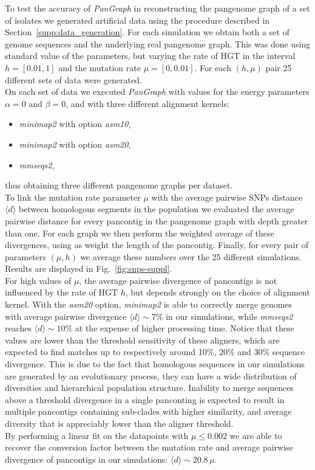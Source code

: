 \documentclass[aps,rmp,reprint,superscriptaddress,notitlepage,10pt,onecolumn]{revtex4-1}
\newcommand{\avg}[1]{\langle #1 \rangle}
\begin{document}
To test the accuracy of \textit{PanGraph} in reconstructing the pangenome graph of a set of isolates we generated artificial data using the procedure described in Section~\ref{supp:data_generation}. For each simulation we obtain both a set of genome sequences and the underlying real pangenome graph. This was done using standard value of the parameters, but varying the rate of HGT in the interval $h=[0.01,1]$ and the mutation rate $\mu=[0,0.01]$. For each $(h,\mu)$ pair 25 different sets of data were generated.\\
On each set of data we executed \textit{PanGraph} with values for the energy parameters $\alpha=0$ and $\beta=0$, and with three different alignment kernels: 
\begin{itemize}
    \itemsep0pt
    \item \textit{minimap2} with option \textit{asm10},
    \item \textit{minimap2} with option \textit{asm20},
    \item \textit{mmseqs2},
\end{itemize}
thus obtaining three different pangenome graphs per dataset.\\
To link the mutation rate parameter $\mu$ with the average pairwise SNPs distance $\avg{d}$ between homologous segments in the population we evaluated the average pairwise distance for every pancontig in the pangenome graph with depth greater than one. For each graph we then perform the weighted average of these divergences, using as weight the length of the pancontig. Finally, for every pair of parameters $(\mu,h)$ we average these numbers over the 25 different simulations. Results are displayed in Fig.~\ref{fig:snps-suppl}.\\
For high values of $\mu$, the average pairwise divergence of pancontigs is not influenced by the rate of HGT $h$, but depends strongly on the choice of alignment kernel. With the \textit{asm20} option, \textit{minimap2} is able to correctly merge genomes with average pairwise divergence $\avg{d} \sim 7\%$ in our simulations, while \textit{mmseqs2} reaches $\avg{d} \sim 10\%$ at the expense of higher processing time. Notice that these values are lower than the threshold sensitivity of these aligners, which are expected to find matches up to respectively around 10\%, 20\% and 30\% sequence divergence. This is due to the fact that homologous sequences in our simulations are generated by an evolutionary process, they can have a wide distribution of diversities and hierarchical population structure. Inability to merge sequences above a threshold divergence in a single panconting is expected to result in multiple pancontigs containing sub-clades with higher similarity, and average diversity that is appreciably lower than the aligner threshold.\\
By performing a linear fit on the datapoints with $\mu \leq 0.002$ we are able to recover the conversion factor between the mutation rate and average pairwise divergence of pancontigs in our simulations: $\avg{d} \sim 20.8 \, \mu$.
\end{document}
